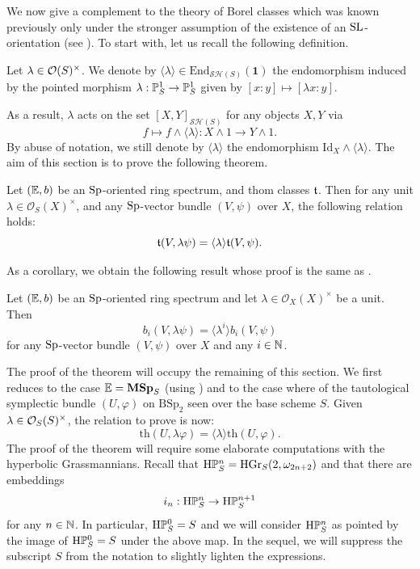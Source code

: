 \begin{num}
We now give a complement to the theory of Borel classes which was known previously only under the stronger assumption of the existence of an $\mathrm{SL}$-orientation
(see \cite[2.2.8]{DF3}). To start with, let us recall the following definition.

\begin{df}
Let $\lambda\in \mathcal O(S)^\times$. We denote by $\langle \lambda\rangle\in \mathrm{End}_{\mathcal{SH}(S)}(\mathbf{1})$ the endomorphism induced by the pointed morphism $\lambda:\mathbb P^1_{S}\to \mathbb P^1_{S}$ given by $[x:y]\mapsto [\lambda x:y]$.
\end{df}

As a result, $\lambda$ acts on the set $[X,Y]_{\mathcal{SH}(S)}$ for any objects $X,Y$ via 
\[
f\mapsto f\wedge \langle \lambda\rangle:X\wedge 1\to Y\wedge 1.
\]
By abuse of notation, we still denote by $\langle\lambda\rangle$ the endomorphism $\mathrm{Id}_X\wedge \langle\lambda\rangle$. The aim of this section is to prove the following theorem.

\begin{thm}\label{thm:epsilon}
Let $(\mathbb E,b)$ be an $\mathrm{Sp}$-oriented ring spectrum, and thom classes $\mathfrak{t}$.
 Then for any unit $\lambda \in \mathcal O_S(X)^\times$, 
 and any $\mathrm{Sp}$-vector bundle $(V,\psi)$ over $X$, the following relation holds:
\[
\mathfrak{t}(V,\lambda\psi)=\langle \lambda \rangle \mathfrak{t}(V,\psi).
\]
\end{thm}

As a corollary, we obtain the following result whose proof is the same as \cite[2.2.8]{DF3}.

\begin{cor}\label{cor:epsilonlinearity}
Let $(\mathbb E,b)$ be an $\mathrm{Sp}$-oriented ring spectrum and let $\lambda \in \mathcal O_X(X)^\times$ be a unit. Then
\[
b_i(V,\lambda\psi)=\langle \lambda^i\rangle b_i(V,\psi)
\]
for any $\mathrm{Sp}$-vector bundle $(V,\psi)$ over $X$ and any $i\in\mathbb{N}$.
\end{cor}

The proof of the theorem will occupy the remaining of this section.
 We first reduces to the case $\mathbb E=\mathbf{MSp}_S$ (using )
 and to the case where of the tautological symplectic bundle $(U,\varphi)$ on $\mathrm{BSp}_2$
 seen over the base scheme $S$. Given $\lambda \in \mathcal O_S(S)^\times$, the relation to prove is now:
\[
\mathrm{th}(U,\lambda\varphi)=\langle \lambda\rangle \mathrm{th}(U,\varphi).
\]
The proof of the theorem will require some elaborate computations with the hyperbolic Grassmannians. Recall that $\mathrm{H}\mathbb P^n_S=\mathrm{HGr}_S(2,\omega_{2n+2})$ and that there are embeddings
\[
i_n:\mathrm{H}\mathbb P^n_S\to \mathrm{H}\mathbb P^{n+1}_S
\]
for any $n\in\mathbb{N}$. In particular, $\mathrm{H}\mathbb P^0_S=S$ and we will consider $\mathrm{H}\mathbb P^{n}_S$ as pointed by the image of $\mathrm{H}\mathbb P^0_S=S$ under the above map. In the sequel, we will suppress the subscript $S$ from the notation to slightly lighten the expressions. 


\end{num}
